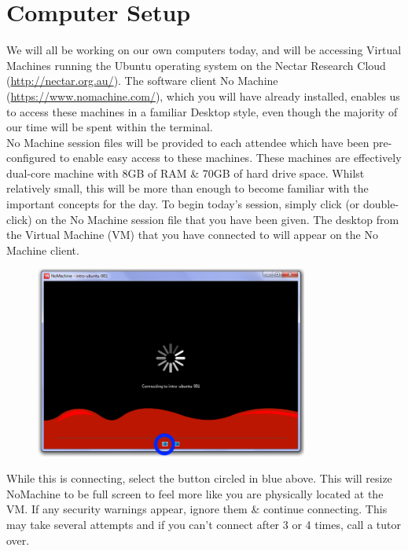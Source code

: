 \documentclass[a4paper,12pt,twoside]{memoir}
\begin{document}
\section{Computer Setup}
\begin{information}
We will all be working on our own computers today, and will be accessing Virtual Machines running the Ubuntu operating system on the Nectar Research Cloud (\url{http://nectar.org.au/}).
The software client No Machine (\url{https://www.nomachine.com/}), which you will have already installed, enables us to access these machines in a familiar Desktop style, even though the majority of our time will be spent within the terminal. \\

No Machine session files will be provided to each attendee which have been pre-configured to enable easy access to these machines.
These machines are effectively dual-core machine with 8GB of RAM \& 70GB of hard drive space.
Whilst relatively small, this will be more than enough to become familiar with the important concepts for the day.
To begin today's session, simply click (or double-click) on the No Machine session file that you have been given.
The desktop from the Virtual Machine (VM) that you have connected to will appear on the
No Machine client. \\
\end{information}

\begin{figure}[h!]
  \centering
    \includegraphics[width=0.8\textwidth]{NoMachine}
\end{figure}

\begin{warning}
While this is connecting, select the button circled in blue above.
This will resize NoMachine to be full screen to feel more like you are physically located at the VM.
If any security warnings appear, ignore them \& continue connecting.
This may take several attempts and if you can't connect after 3 or 4 times, call a tutor over.
\end{warning}
\end{document}
